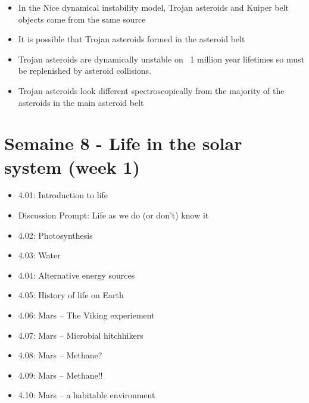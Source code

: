 \begin{enumerate}
    \begin{multicols}{2} \begin{itemize}[label={$\bullet$}]
        \item In the Nice dynamical instability model, Trojan asteroids and Kuiper belt objects come from the same source
        \item It is possible that Trojan asteroids formed in the asteroid belt
        \item Trojan asteroids are dynamically unstable on ~1 million year lifetimes so must be replenished by asteroid collisions.
        \item Trojan asteroids look different spectroscopically from the majority of the asteroids in the main asteroid belt
    \end{itemize}\end{multicols}
\end{enumerate}


\newpage 

\section*{Semaine 8 - Life in the solar system (week 1)}

\begin{itemize}[label={$\bullet$}]
    \item 4.01: Introduction to life
    \item Discussion Prompt: Life as we do (or don't) know it
    \item 4.02: Photosynthesis
    \item 4.03: Water
    \item 4.04: Alternative energy sources
    \item 4.05: History of life on Earth
    \item 4.06: Mars -- The Viking experiement
    \item 4.07: Mars -- Microbial hitchhikers
    \item 4.08: Mars -- Methane?
    \item 4.09: Mars -- Methane!!
    \item 4.10: Mars -- a habitable environment
\end{itemize}

